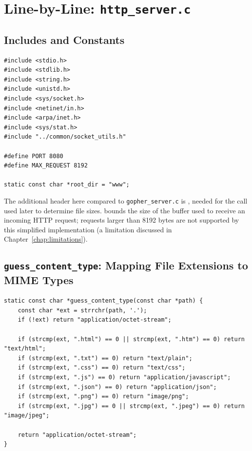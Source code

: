 \chapter{Line-by-Line: \texttt{http\_server.c}}
\label{chap:http-server}

\section{Includes and Constants}

\begin{lstlisting}[style=cstyle]
#include <stdio.h>
#include <stdlib.h>
#include <string.h>
#include <unistd.h>
#include <sys/socket.h>
#include <netinet/in.h>
#include <arpa/inet.h>
#include <sys/stat.h>
#include "../common/socket_utils.h"

#define PORT 8080
#define MAX_REQUEST 8192

static const char *root_dir = "www";
\end{lstlisting}

The additional header here compared to \texttt{gopher\_server.c} is , needed for the  call used later to determine file sizes.  bounds the size of the buffer used to receive an incoming HTTP request; requests larger than 8192 bytes are not supported by this simplified implementation (a limitation discussed in Chapter~\ref{chap:limitations}).

\section{\texttt{guess\_content\_type}: Mapping File Extensions to MIME Types}

\begin{lstlisting}[style=cstyle]
static const char *guess_content_type(const char *path) {
    const char *ext = strrchr(path, '.');
    if (!ext) return "application/octet-stream";

    if (strcmp(ext, ".html") == 0 || strcmp(ext, ".htm") == 0) return "text/html";
    if (strcmp(ext, ".txt") == 0) return "text/plain";
    if (strcmp(ext, ".css") == 0) return "text/css";
    if (strcmp(ext, ".js") == 0) return "application/javascript";
    if (strcmp(ext, ".json") == 0) return "application/json";
    if (strcmp(ext, ".png") == 0) return "image/png";
    if (strcmp(ext, ".jpg") == 0 || strcmp(ext, ".jpeg") == 0) return "image/jpeg";

    return "application/octet-stream";
}
\end{lstlisting}

